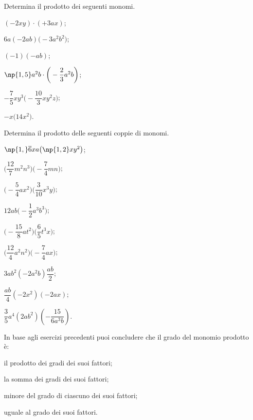 \begin{esercizio}
 \label{ese:10.13} %
Determina il prodotto dei seguenti monomi.
\begin{multicols}{3}
\begin{enumeratea}
\spazielenx
 \item $(-2xy)\cdot (+3ax)$;
 \item $6a(-2ab)\big(-3a^{2}b^{2}\big)$;
 \item $(-1)(-ab)$;
 \item $\np{1,5}a^{2}b\cdot \bigg(-{\dfrac{2}{3}}a^{2}b\bigg)$;
 \item $-{\dfrac{7}{5}}xy^{3}\bigg(-{\dfrac{10}{3}}xy^{2}z\bigg)$;
 \item $-x\big(14x^{2}\big)$.
\end{enumeratea}
\end{multicols}
\end{esercizio}
\pagebreak
\begin{esercizio}[\Ast]
 \label{ese:10.14} %
Determina il prodotto delle seguenti coppie di monomi.
\begin{multicols}{3}
\begin{enumeratea}
 \item $\np{1,}\overline{{6}}xa\big(\np{1,2}xy^{2}\big)$;
 \item $\bigg(\dfrac{12}{7}m^{2}n^{3}\bigg)\bigg(-{\dfrac{7}{4}}mn\bigg)$;
 \item $\bigg(-{\dfrac{5}{4}}ax^{2}\bigg)\bigg(\dfrac{3}{10}x^{3}y\bigg)$;
 \item $12ab\bigg(-{\dfrac{1}{2}}a^{3}b^{3}\bigg)$;
 \item $\bigg(-{\dfrac{15}{8}}at^{2}\bigg)\bigg(\dfrac{6}{5}t^{3}x\bigg)$;
 \item $\bigg(\dfrac{12}{4}a^{2}n^{2}\bigg)\bigg(-{\dfrac{7}{4}}ax\bigg)$;
 \item $3ab^2\left(-2a^2b\right)\dfrac{ab}{2}$;
 \item $\dfrac{ab}{4}\left(-2x^2\right)(-2ax)$;
 \item $\dfrac{3}{5}a^4\left({2ab^2}\right)\left(-\dfrac{15}{6a^3b}\right)$.
\end{enumeratea}
\end{multicols}
\end{esercizio}


\begin{esercizio}
 \label{ese:10.15} %
In base agli esercizi precedenti puoi concludere che il grado del monomio prodotto è:

\begin{enumeratea}
 \item il prodotto dei gradi dei suoi fattori;
 \item la somma dei gradi dei suoi fattori;
 \item minore del grado di ciascuno dei suoi fattori;
 \item uguale al grado dei suoi fattori.
\end{enumeratea}
\end{esercizio}

